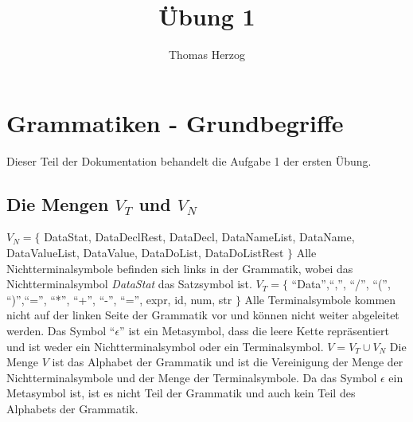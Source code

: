 \documentclass[11pt, a4paper, twoside]{article}   	%
\title{Übung 1}
\author{Thomas Herzog}
\begin{document}
\setlength{\headheight}{15mm}


\section {Grammatiken - Grundbegriffe}
Dieser Teil der Dokumentation behandelt die Aufgabe 1 der ersten Übung.
\subsection{Die Mengen $V_{T}$ und $V_{N}$}
$V_{N}=\{$ DataStat, DataDeclRest, DataDecl, DataNameList, DataName, DataValueList, DataValue, DataDoList, DataDoListRest $\}$
\newline
\newline
Alle Nichtterminalsymbole befinden sich links in der Grammatik, wobei das Nichtterminalsymbol \emph{DataStat} das Satzsymbol ist.
\newline
\newline
\newline
$V_{T}=\{$ \enquote{Data},\enquote{,}, \enquote{/}, \enquote{(}, \enquote{)},\enquote{=}, \enquote{*}, \enquote{+}, \enquote{-}, \enquote{=}, expr, id, num, str $\}$
\newline
\newline
Alle Terminalsymbole kommen nicht auf der linken Seite der Grammatik vor und können nicht weiter abgeleitet werden. Das Symbol \enquote{$\epsilon$} ist ein Metasymbol, dass die leere Kette repräsentiert und ist weder ein Nichtterminalsymbol oder ein Terminalsymbol.
\newline
\newline
\newline
$V=V_{T} \cup V_{N}$
\newline
\newline
Die Menge $V$ ist das Alphabet der Grammatik und ist die Vereinigung der Menge der Nichtterminalsymbole und der Menge der Terminalsymbole. Da das Symbol $\epsilon$ ein Metasymbol ist, ist es nicht Teil der Grammatik und auch kein Teil des Alphabets der Grammatik.
\end{document}
